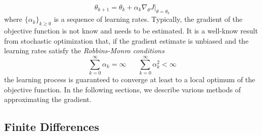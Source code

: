 \begin{equation}
	\theta_{k+1} = \theta_k + \alpha_k \nabla_\theta J|_{\theta = \theta_k}
\end{equation}
where $\{\alpha_k\}_{k\geq 0}$ is a sequence of learning rates. Typically, the
gradient of the objective function is not know and needs to be estimated. It is
a well-know result from stochastic optimization that, if the gradient estimate
is unbiased and the learning rates satisfy the \emph{Robbins-Monro conditions}
\begin{equation}
	\sum_{k=0}^\infty \alpha_k = \infty \;\;\;\;\;\; \sum^{\infty}_{k=0}
	\alpha_k^2 < \infty 
\end{equation}
the learning process is guaranteed to converge at least to a local optimum of
the objective function. In the following sections, we describe various methods
of approximating the gradient. 

\subsection{Finite Differences}

